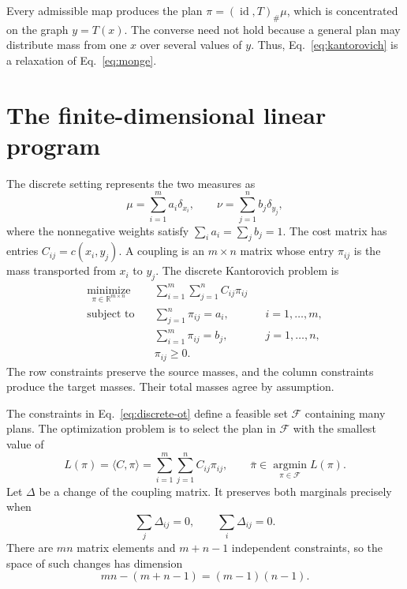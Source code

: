 \documentclass[11pt]{article}
\newcommand{\R}{\mathbb{R}}
\begin{document}
Every admissible map produces the plan
$\pi=(\operatorname{id},T)_{\#}\mu$, which is concentrated on the graph
$y=T(x)$. The converse need not hold because a general plan may distribute
mass from one $x$ over several values of $y$. Thus,
Eq.~\eqref{eq:kantorovich} is a relaxation of Eq.~\eqref{eq:monge}.

\section{The finite-dimensional linear program}

The discrete setting represents the two measures as
\begin{equation}
  \mu=\sum_{i=1}^{m}a_i\delta_{x_i},
  \qquad
  \nu=\sum_{j=1}^{n}b_j\delta_{y_j},
\end{equation}
where the nonnegative weights satisfy
$\sum_i a_i=\sum_j b_j=1$. The cost matrix has entries
$C_{ij}=c(x_i,y_j)$. A coupling is an $m\times n$ matrix whose entry
$\pi_{ij}$ is the mass transported from $x_i$ to $y_j$. The discrete
Kantorovich problem is
\begin{equation}
  \begin{aligned}
    \underset{\pi\in\R^{m\times n}}{\operatorname{minimize}}
    \quad &\sum_{i=1}^{m}\sum_{j=1}^{n}C_{ij}\pi_{ij}\\
    \text{subject to}\quad
    &\sum_{j=1}^{n}\pi_{ij}=a_i,
      &&i=1,\ldots,m,\\
    &\sum_{i=1}^{m}\pi_{ij}=b_j,
      &&j=1,\ldots,n,\\
    &\pi_{ij}\geq0.
  \end{aligned}
  \label{eq:discrete-ot}
\end{equation}
The row constraints preserve the source masses, and the column constraints
produce the target masses. Their total masses agree by assumption.

The constraints in Eq.~\eqref{eq:discrete-ot} define a feasible set
$\mathcal F$ containing many plans. The
optimization problem is to select the plan in $\mathcal F$ with the smallest
value of
\begin{equation}
  L(\pi)=\langle C,\pi\rangle
  =\sum_{i=1}^m\sum_{j=1}^n C_{ij}\pi_{ij},
  \qquad
  \bar\pi\in\operatorname*{argmin}_{\pi\in\mathcal F}L(\pi).
  \label{eq:transport-lp-objective}
\end{equation}
Let $\Delta$ be a change of the coupling matrix. It preserves both marginals
precisely when
\[
  \sum_j\Delta_{ij}=0,
  \qquad
  \sum_i\Delta_{ij}=0.
\]
There are $mn$ matrix elements and $m+n-1$ independent constraints, so the
space of such changes has dimension
\[
  mn-(m+n-1)=(m-1)(n-1).
\]
\end{document}
